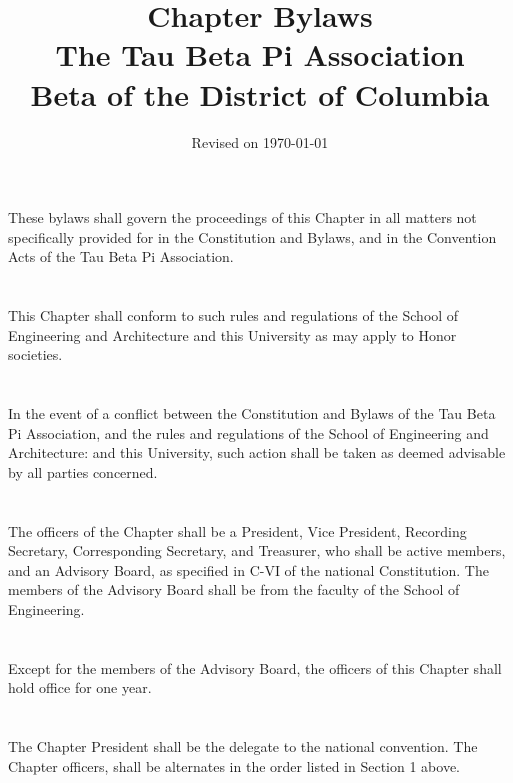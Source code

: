 \documentclass[12pt]{constitution}
\begin{document}
\title{Chapter Bylaws\\The Tau Beta Pi Association\\Beta of the District of Columbia}
\author{Revised on \today}
\date{}
\maketitle

\section{}
These bylaws shall govern the proceedings of this Chapter in all matters not specifically provided for in the Constitution and Bylaws, and in the Convention Acts of the Tau Beta Pi Association. 
\section{}
This Chapter shall conform to such rules and regulations of the School of Engineering and Architecture and this University as may apply to Honor societies. 
\section{}
In the event of a conflict between the Constitution and Bylaws of the Tau Beta Pi Association, and the rules and regulations of the School of Engineering and Architecture: and this University, such action shall be taken as deemed advisable by all parties concerned. 

\section{} %
The officers of the Chapter shall be a President, Vice President, Recording Secretary, Corresponding Secretary, and Treasurer, who shall be active members, and an Advisory Board, as specified in C-VI of the national Constitution. The members of the Advisory Board shall be from the faculty of the School of Engineering.
\section{}
Except for the members of the Advisory Board, the officers of this Chapter shall hold office for one year.
\section{}
The Chapter President shall be the delegate to the national convention. The Chapter officers, shall be alternates in the order listed in Section 1 above.
\end{document}
